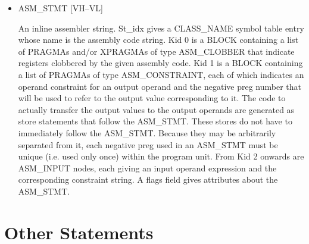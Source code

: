 \begin{itemize}
%
\item  ASM\_STMT \hfill [VH--VL]

An inline assembler string. St\_idx gives a CLASS\_NAME symbol
table entry whose name is the assembly code string. Kid 0 is a
%
BLOCK containing a list of
%
PRAGMAs and/or
%
XPRAGMAs of type
ASM\_CLOBBER that indicate registers clobbered by the given assembly
code. Kid 1 is a
%
BLOCK containing a list of
%
PRAGMAs of type
%
ASM\_CONSTRAINT, each of
which indicates an operand constraint for an output operand and
the negative preg number that will be used to refer to the output
value corresponding to it. The code to actually transfer the output
values to the output operands are generated as store statements
that follow the 
%
ASM\_STMT. These stores do not have to immediately
follow the 
%
ASM\_STMT. Because they may be arbitrarily separated from
it, each negative preg used in an
%
ASM\_STMT must be unique (i.e. used only once)
within the program unit. From Kid 2 onwards are 
%
ASM\_INPUT
nodes, each giving an input operand expression and the corresponding
constraint string. A flags field gives attributes about the ASM\_STMT.

\end{itemize}
\section{Other Statements}

